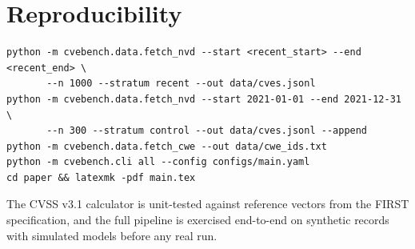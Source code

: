 \documentclass[11pt]{article}
\begin{document}
\section{Reproducibility}\label{app:repro}
\begin{verbatim}
python -m cvebench.data.fetch_nvd --start <recent_start> --end <recent_end> \
       --n 1000 --stratum recent --out data/cves.jsonl
python -m cvebench.data.fetch_nvd --start 2021-01-01 --end 2021-12-31 \
       --n 300 --stratum control --out data/cves.jsonl --append
python -m cvebench.data.fetch_cwe --out data/cwe_ids.txt
python -m cvebench.cli all --config configs/main.yaml
cd paper && latexmk -pdf main.tex
\end{verbatim}
The CVSS v3.1 calculator is unit-tested against reference vectors from the FIRST specification, and the full pipeline is exercised end-to-end on synthetic records with simulated models before any real run.
\end{document}
